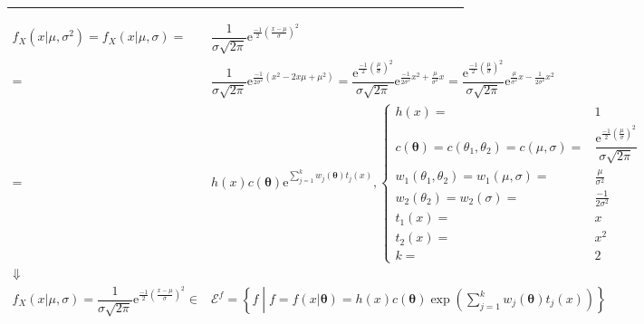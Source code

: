 \documentclass[
]{book}
\theoremstyle{definition}
\theoremstyle{definition}
\theoremstyle{definition}
\theoremstyle{definition}
\theoremstyle{remark}
\begin{document}
\begin{center}\rule{0.5\linewidth}{0.5pt}\end{center}

\[
\begin{aligned}
f_{{\scriptscriptstyle X}}\left(x|\mu,\sigma^{2}\right)=f_{{\scriptscriptstyle X}}\left(x|\mu,\sigma\right)= & \dfrac{1}{\sigma\sqrt{2\pi}}\mathrm{e}^{\frac{-1}{2}\left(\frac{x-\mu}{\sigma}\right)^{2}}\\
= & \dfrac{1}{\sigma\sqrt{2\pi}}\mathrm{e}^{\frac{-1}{2\sigma^{2}}\left(x^{2}-2x\mu+\mu^{2}\right)}=\dfrac{\mathrm{e}^{\frac{-1}{2}\left(\frac{\mu}{\sigma}\right)^{2}}}{\sigma\sqrt{2\pi}}\mathrm{e}^{\frac{-1}{2\sigma^{2}}x^{2}+\frac{\mu}{\sigma^{2}}x}=\dfrac{\mathrm{e}^{\frac{-1}{2}\left(\frac{\mu}{\sigma}\right)^{2}}}{\sigma\sqrt{2\pi}}\mathrm{e}^{\frac{\mu}{\sigma^{2}}x-\frac{1}{2\sigma^{2}}x^{2}}\\
= & h\left(x\right)c\left(\boldsymbol{\theta}\right)\mathrm{e}^{{\scriptscriptstyle \sum\limits _{j=1}^{k}w_{{\scriptscriptstyle j}}\left(\boldsymbol{\theta}\right)t_{{\scriptscriptstyle j}}\left(x\right)}},\begin{cases}
h\left(x\right)= & 1\\
c\left(\boldsymbol{\theta}\right)=c\left(\theta_{{\scriptscriptstyle 1}},\theta_{{\scriptscriptstyle 2}}\right)=c\left(\mu,\sigma\right)= & \dfrac{\mathrm{e}^{\frac{-1}{2}\left(\frac{\mu}{\sigma}\right)^{2}}}{\sigma\sqrt{2\pi}}\\
w_{{\scriptscriptstyle 1}}\left(\theta_{{\scriptscriptstyle 1}},\theta_{{\scriptscriptstyle 2}}\right)=w_{{\scriptscriptstyle 1}}\left(\mu,\sigma\right)= & \frac{\mu}{\sigma^{2}}\\
w_{{\scriptscriptstyle 2}}\left(\theta_{{\scriptscriptstyle 2}}\right)=w_{{\scriptscriptstyle 2}}\left(\sigma\right)= & \frac{-1}{2\sigma^{2}}\\
t_{{\scriptscriptstyle 1}}\left(x\right)= & x\\
t_{{\scriptscriptstyle 2}}\left(x\right)= & x^{2}\\
k= & 2
\end{cases}\\
\Downarrow\\
f_{{\scriptscriptstyle X}}\left(x|\mu,\sigma\right)=\dfrac{1}{\sigma\sqrt{2\pi}}\mathrm{e}^{\frac{-1}{2}\left(\frac{x-\mu}{\sigma}\right)^{2}}\in & \mathcal{E}^{f}=\left\{ f\middle|f=f\left(x|\boldsymbol{\theta}\right)=h\left(x\right)c\left(\boldsymbol{\theta}\right)\exp\left(\sum\limits _{j=1}^{k}w_{{\scriptscriptstyle j}}\left(\boldsymbol{\theta}\right)t_{{\scriptscriptstyle j}}\left(x\right)\right)\right\} 
\end{aligned}
\]
\end{document}

